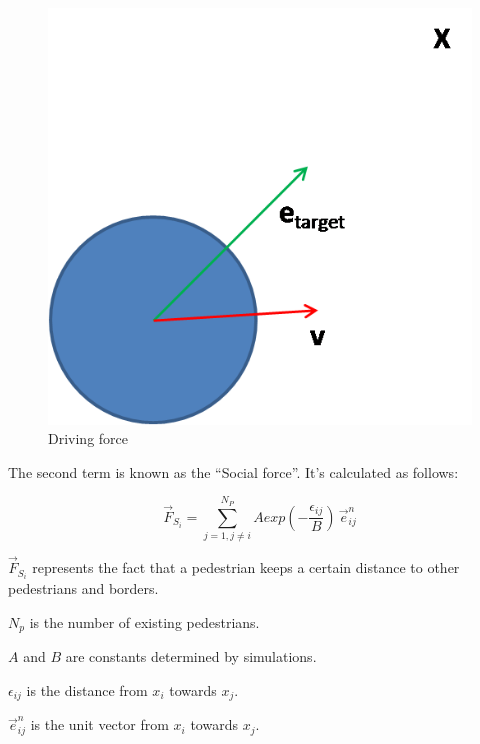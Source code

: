 \documentclass[draftclsnofoot]{IEEEtran}
\begin{document}
\begin{figure}[h]
    \begin{centering}
    \includegraphics[scale=0.4]{pics/sfm/drivingforce} 
    \par
    \end{centering}
    \caption{\label{fig:driving-force}Driving force}
\end{figure}

The second term is known as the ``Social force''. It's calculated
as follows:

\begin{equation}
    \vec{F}_{S_{i}}=\sum_{j=1,j\ne     i}^{N_{P}}Aexp(-\frac{\epsilon_{ij}}{B})\,\vec{e}_{ij}^{n}\label{eq:social-force}
\end{equation}


$\vec{F}_{S_{i}}$ represents the fact that a pedestrian keeps a certain
distance to other pedestrians and borders.

$N_{p}$ is the number of existing pedestrians.

$A$ and $B$ are constants determined by simulations.

$\epsilon_{ij}$ is the distance from $x_{i}$ towards $x_{j}$.

$\vec{e}_{ij}^{n}$ is the unit vector from $x_{i}$ towards $x_{j}$.\\
\end{document}
